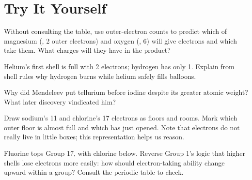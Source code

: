 \section*{Try It Yourself}

\begin{sikaoti}
\item Without consulting the table, use outer-electron counts to predict which of magnesium (, 2 outer electrons) and oxygen (, 6) will give electrons and which take them. What charges will they have in the product?
\item Helium's first shell is full with 2 electrons; hydrogen has only 1. Explain from shell rules why hydrogen burns while helium safely fills balloons.
\item Why did Mendeleev put tellurium before iodine despite its greater atomic weight? What later discovery vindicated him?
\item Draw sodium's 11 and chlorine's 17 electrons as floors and rooms. Mark which outer floor is almost full and which has just opened. Note that electrons do not really live in little boxes; this representation helps us reason.
\item Fluorine tops Group 17, with chlorine below. Reverse Group 1's logic that higher shells lose electrons more easily: how should electron-taking ability change upward within a group? Consult the periodic table to check.
\end{sikaoti}
